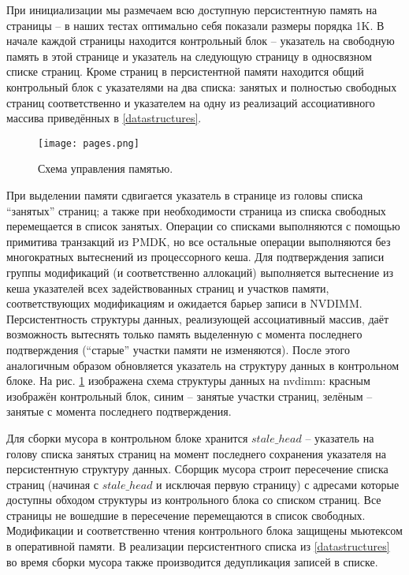 \documentclass[pdftex,ptm,12pt,a4paper]{report}
\theoremstyle{definition}
\begin{document}
При инициализации мы размечаем всю доступную персистентную память на страницы -- в наших тестах оптимально себя показали размеры порядка 1K.
В начале каждой страницы находится контрольный блок -- указатель на свободную память в этой странице и указатель на следующую страницу в односвязном списке страниц.
Кроме страниц в персистентной памяти находится общий контрольный блок с указателями на два списка: занятых и полностью свободных страниц соответственно и
указателем на одну из реализаций ассоциативного массива приведённых в \ref{datastructures}.

\begin{figure}[h]
\centering
\texttt{[image: pages.png]}
\caption{Схема управления памятью.}
\label{mempic}
\end{figure}

При выделении памяти сдвигается указатель в странице из головы списка ``занятых'' страниц; а также при необходимости страница из списка свободных перемещается в список занятых.
Операции со списками выполняются с помощью примитива транзакций из PMDK, но все остальные операции выполняются без многократных вытеснений из процессорного кеша.
Для подтверждения записи группы модификаций (и соответственно аллокаций) выполняется вытеснение из кеша указателей всех задействованных страниц и участков памяти,
соответствующих модификациям и ожидается барьер записи в NVDIMM. Персистентность структуры данных, реализующей ассоциативный массив, даёт возможность вытеснять только память выделенную
с момента последнего подтверждения (``старые'' участки памяти не изменяются).
После этого аналогичным образом обновляется указатель на структуру данных в контрольном блоке.
На рис. \ref{mempic} изображена схема структуры данных на nvdimm: красным изображён контрольный блок, синим -- занятые участки страниц, зелёным -- занятые с момента последнего
подтверждения.
 
Для сборки мусора в контрольном блоке хранится $stale\_head$ -- указатель на голову списка занятых страниц на момент последнего сохранения указателя на персистентную структуру данных.
Сборщик мусора строит пересечение списка страниц (начиная с $stale\_head$ и исключая первую страницу) с адресами которые доступны обходом структуры из контрольного блока со списком страниц.
Все страницы не вошедшие в пересечение перемещаются в список свободных. Модификации и соответственно чтения контрольного блока защищены мьютексом в оперативной памяти.
В реализации персистентного списка из \ref{datastructures} во время сборки мусора также производится дедупликация записей в списке.
\end{document}
